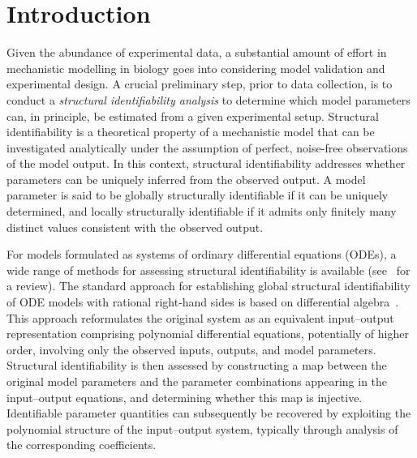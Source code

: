 \documentclass[12pt]{article}
\begin{document}

\section{Introduction}

Given the abundance of experimental data, a substantial amount of effort in mechanistic modelling in biology goes into considering model validation and experimental design. A crucial preliminary step, prior to data collection, is to conduct a \emph{structural identifiability analysis} to determine which model parameters can, in principle, be estimated from a given experimental setup. Structural identifiability is a theoretical property of a mechanistic model that can be investigated analytically under the assumption of perfect, noise-free observations of the model output. In this context, structural identifiability addresses whether parameters can be uniquely inferred from the observed output. A model parameter is said to be globally structurally identifiable if it can be uniquely determined, and locally structurally identifiable if it admits only finitely many distinct values consistent with the observed output.

 

For models formulated as systems of ordinary differential equations (ODEs), a wide range of methods for assessing structural identifiability is available (see~\cite{chis2011structural} for a review). The standard approach for establishing global structural identifiability of ODE models with rational right-hand sides is based on differential algebra~\cite{ljung1994global,hong2020global,saccomani2001new,walter1982global}. This approach reformulates the original system as an equivalent input–output representation comprising polynomial differential equations, potentially of higher order, involving only the observed inputs, outputs, and model parameters. Structural identifiability is then assessed by constructing a map between the original model parameters and the parameter combinations appearing in the input–output equations, and determining whether this map is injective. Identifiable parameter quantities can subsequently be recovered by exploiting the polynomial structure of the input–output system, typically through analysis of the corresponding coefficients.
\end{document}
